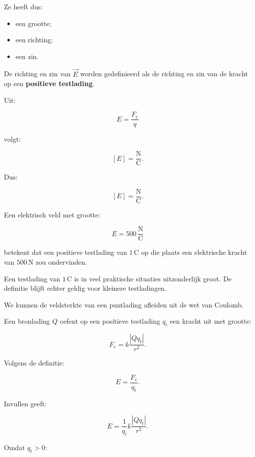 \documentclass{ximera}
\begin{document}
Ze heeft dus:

\begin{itemize}
  \item een grootte;
  \item een richting;
  \item een zin.
\end{itemize}


De richting en zin van $\vec E$ worden gedefinieerd als de richting en
zin van de kracht op een \textbf{positieve testlading}.




Uit:

\[
E=\frac{F_e}{q}
\]

volgt:

\[
[E]
=
\frac{\mathrm N}{\mathrm C}.
\]

Dus:

\[
\boxed{
[E]=\mathrm{\frac NC}.
}
\]

Een elektrisch veld met grootte:

\[
E=500\,\mathrm{\frac NC}
\]

betekent dat een positieve testlading van $1\,\mathrm C$ op die plaats
een elektrische kracht van $500\,\mathrm N$ zou ondervinden.

Een testlading van $1\,\mathrm C$ is in veel praktische situaties
uitzonderlijk groot. De definitie blijft echter geldig voor kleinere
testladingen.




We kunnen de veldsterkte van een puntlading afleiden uit de wet van
Coulomb.

Een bronlading $Q$ oefent op een positieve testlading $q_t$ een kracht
uit met grootte:

\[
F_e
=
k\frac{|Qq_t|}{r^2}.
\]

Volgens de definitie:

\[
E=\frac{F_e}{q_t}.
\]

Invullen geeft:

\[
E
=
\frac{1}{q_t}
k\frac{|Qq_t|}{r^2}.
\]

Omdat $q_t>0$:
\end{document}

